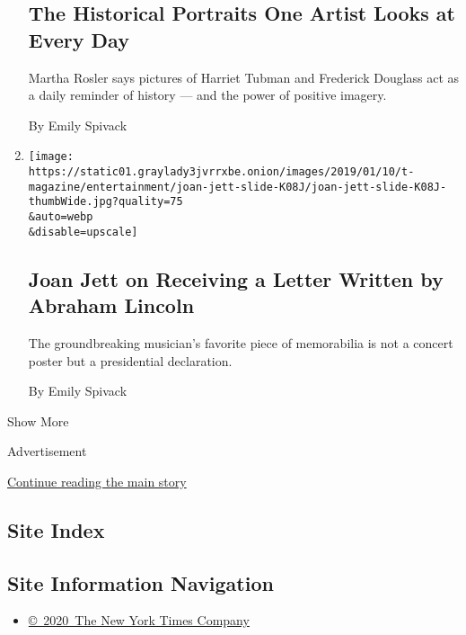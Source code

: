 \begin{enumerate}
{  \subsection{The Historical Portraits One Artist Looks at Every
  Day}\label{the-historical-portraits-one-artist-looks-at-every-day}}

  Martha Rosler says pictures of Harriet Tubman and Frederick Douglass
  act as a daily reminder of history --- and the power of positive
  imagery.

  By Emily Spivack
\item
  \href{/2019/01/14/t-magazine/joan-jett-abraham-lincoln-letter.html}{}

  \texttt{[image: https://static01.graylady3jvrrxbe.onion/images/2019/01/10/t-magazine/entertainment/joan-jett-slide-K08J/joan-jett-slide-K08J-thumbWide.jpg?quality=75\\\&auto=webp\\\&disable=upscale]}

  \hypertarget{joan-jett-on-receiving-a-letter-written-by-abraham-lincoln}{%
  \subsection{Joan Jett on Receiving a Letter Written by Abraham
  Lincoln}\label{joan-jett-on-receiving-a-letter-written-by-abraham-lincoln}}

  The groundbreaking musician's favorite piece of memorabilia is not a
  concert poster but a presidential declaration.

  By Emily Spivack
\end{enumerate}

Show More

Advertisement

\protect\hyperlink{after-mid2}{Continue reading the main story}

\hypertarget{site-index}{%
\subsection{Site Index}\label{site-index}}

\hypertarget{site-information-navigation}{%
\subsection{Site Information
Navigation}\label{site-information-navigation}}

\begin{itemize}
\tightlist
\item
  \href{https://help.nytimes3xbfgragh.onion/hc/en-us/articles/115014792127-Copyright-notice}{©~2020~The
  New York Times Company}
\end{itemize}

